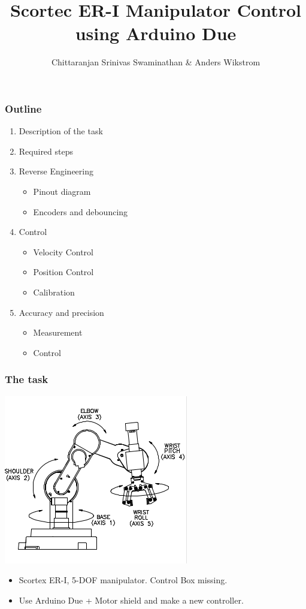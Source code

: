 \documentclass{beamer}
\title[Sensors Assignment 3]
{Scortec ER-I Manipulator Control using Arduino Due}
\author
{Chittaranjan Srinivas Swaminathan \& Anders Wikstrom}
\institute{Orebro University}
\begin{document}
\frame{\titlepage}
  \begin{frame}
    \frametitle{Outline}
    \begin{enumerate}
      \item Description of the task
      \item Required steps
      \item Reverse Engineering
        \begin{itemize}
          \item Pinout diagram
          \item Encoders and debouncing
        \end{itemize}
      \item Control
        \begin{itemize}
          \item Velocity Control
          \item Position Control
          \item Calibration
        \end{itemize}
      \item Accuracy and precision
        \begin{itemize}
          \item Measurement 
          \item Control
        \end{itemize}
    \end{enumerate}

  \end{frame}
  \begin{frame}
    \frametitle{The task}
    \centering
    \includegraphics[scale=0.75]{../Report/axes.png}
    \begin{itemize}
      \item<1-> Scortex ER-I, 5-DOF manipulator. Control Box missing.
      \item<2-> Use Arduino Due + Motor shield and make a new controller.
    \end{itemize}
  \end{frame}
  
\end{document}
